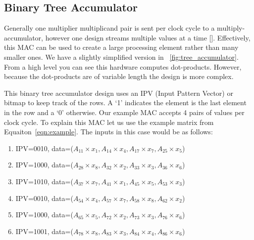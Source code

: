 \subsection{Binary Tree Accumulator}
Generally one multiplier multiplicand pair is sent per clock cycle to a multiply-accumulator, however one design streams multiple values at a time [\cite{prelim:sun2}]. Effectively, this MAC can be used to create a large processing element rather than many smaller ones. We have a slightly simplified version in \figurename~\ref{fig:tree_accumulator}. From a high level you can see this hardware computes dot-products. However, because the dot-products are of variable length the design is more complex.

\par This binary tree accumulator design uses an IPV (Input Pattern Vector) or bitmap to keep track of the rows. A `1' indicates the element is the last element in the row and a `0' otherwise. Our example MAC accepts 4 pairs of values per clock cycle. To explain this MAC let us use the example matrix from Equaiton~\ref{eqn:example}. The inputs in this case would be as follows:
\begin{enumerate}
    \item IPV=0010, data=($A_{11}\times x_1, A_{14}\times x_4, A_{17}\times x_7, A_{25}\times x_5$)
    \item IPV=1000, data=($A_{28}\times x_8, A_{32}\times x_2, A_{33}\times x_3, A_{36}\times x_6$)
    \item IPV=1010, data=($A_{37}\times x_7, A_{41}\times x_1, A_{45}\times x_5, A_{53}\times x_3$)
    \item IPV=0010, data=($A_{54}\times x_4, A_{57}\times x_7, A_{58}\times x_8, A_{62}\times x_2$)
    \item IPV=1000, data=($A_{65}\times x_5, A_{72}\times x_2, A_{73}\times x_3, A_{76}\times x_6$)
    \item IPV=1001, data=($A_{78}\times x_8, A_{83}\times x_3, A_{84}\times x_4, A_{86}\times x_6$)
\end{enumerate}
